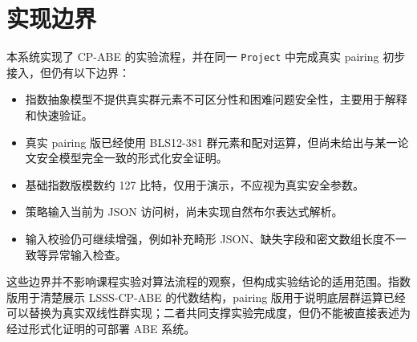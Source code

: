 \section{实现边界}

本系统实现了 CP-ABE 的实验流程，并在同一 \verb|Project| 中完成真实 pairing 初步接入，但仍有以下边界：

\begin{itemize}
    \item 指数抽象模型不提供真实群元素不可区分性和困难问题安全性，主要用于解释和快速验证。
    \item 真实 pairing 版已经使用 BLS12-381 群元素和配对运算，但尚未给出与某一论文安全模型完全一致的形式化安全证明。
    \item 基础指数版模数约 127 比特，仅用于演示，不应视为真实安全参数。
    \item 策略输入当前为 JSON 访问树，尚未实现自然布尔表达式解析。
    \item 输入校验仍可继续增强，例如补充畸形 JSON、缺失字段和密文数组长度不一致等异常输入检查。
\end{itemize}

这些边界并不影响课程实验对算法流程的观察，但构成实验结论的适用范围。指数版用于清楚展示 LSSS-CP-ABE 的代数结构，pairing 版用于说明底层群运算已经可以替换为真实双线性群实现；二者共同支撑实验完成度，但仍不能被直接表述为经过形式化证明的可部署 ABE 系统。
